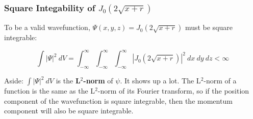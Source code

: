 \documentclass{beamer}
\begin{document}
\begin{frame}
\frametitle{Square Integability of $J_0(2\sqrt{x+r})$}


To be a valid wavefunction, $\Psi(x,y,z) = J_0(2\sqrt{x+r})$ must be square integrable:

\[ \int |\Psi|^2\ dV = \int_{-\infty}^{\infty} \int_{-\infty}^{\infty} \int_{-\infty}^{\infty} \left|J_0(2\sqrt{x+r})\right|^2\ dx\ dy\ dz  < \infty\]

Aside: $\int |\Psi|^2\ dV$ is the {\bf L$^2$-norm} of $\psi$.  It shows up a lot.  The L$^2$-norm of
a function is the same as the L$^2$-norm of its Fourier transform, so if the position component of the
wavefunction is square integrable, then the momentum component will also be square integrable.


\end{frame}
\end{document}
